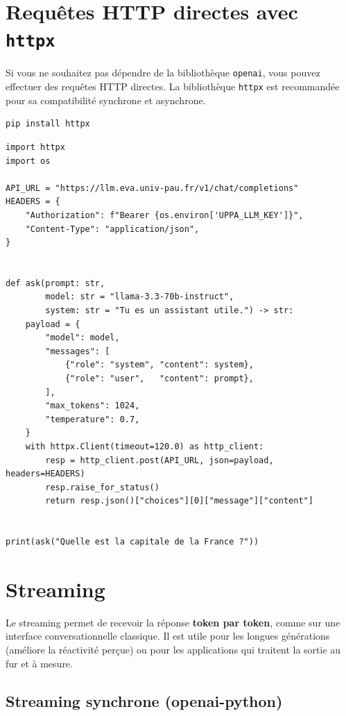 \documentclass[12pt, a4paper, twoside]{article}
\begin{document}
\section{Requêtes HTTP directes avec \texttt{httpx}}
\label{sec:httpx}

Si vous ne souhaitez pas dépendre de la bibliothèque \texttt{openai}, vous pouvez effectuer
des requêtes HTTP directes. La bibliothèque \texttt{httpx} est recommandée pour sa compatibilité
synchrone et asynchrone.

\begin{lstlisting}[style=bashstyle]
pip install httpx
\end{lstlisting}

\begin{lstlisting}[style=pythonstyle, caption={Requête HTTP directe avec httpx}]
import httpx
import os

API_URL = "https://llm.eva.univ-pau.fr/v1/chat/completions"
HEADERS = {
    "Authorization": f"Bearer {os.environ['UPPA_LLM_KEY']}",
    "Content-Type": "application/json",
}


def ask(prompt: str,
        model: str = "llama-3.3-70b-instruct",
        system: str = "Tu es un assistant utile.") -> str:
    payload = {
        "model": model,
        "messages": [
            {"role": "system", "content": system},
            {"role": "user",   "content": prompt},
        ],
        "max_tokens": 1024,
        "temperature": 0.7,
    }
    with httpx.Client(timeout=120.0) as http_client:
        resp = http_client.post(API_URL, json=payload, headers=HEADERS)
        resp.raise_for_status()
        return resp.json()["choices"][0]["message"]["content"]


print(ask("Quelle est la capitale de la France ?"))
\end{lstlisting}

\section{Streaming}
\label{sec:streaming}

Le streaming permet de recevoir la réponse \textbf{token par token}, comme sur une interface
conversationnelle classique. Il est utile pour les longues générations (améliore la réactivité
perçue) ou pour les applications qui traitent la sortie au fur et à mesure.

\subsection{Streaming synchrone (openai-python)}
\end{document}
